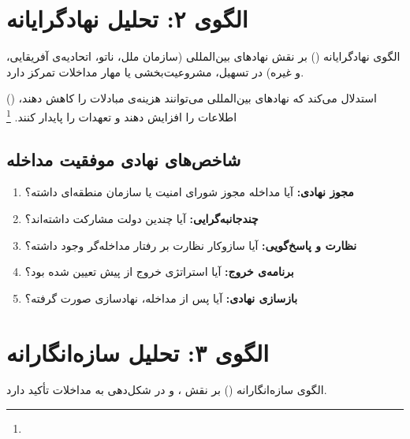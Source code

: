 \section{الگوی ۲: تحلیل نهادگرایانه}
\label{sec:ch03-institutional}

الگوی نهادگرایانه () بر نقش نهادهای بین‌المللی (سازمان ملل، ناتو، اتحادیه‌ی آفریقایی، و غیره) در تسهیل، مشروعیت‌بخشی یا مهار مداخلات تمرکز دارد.

 () استدلال می‌کند که نهادهای بین‌المللی می‌توانند هزینه‌ی مبادلات را کاهش دهند، اطلاعات را افزایش دهند و تعهدات را پایدار کنند.%
\footnote{}

\subsection{شاخص‌های نهادی موفقیت مداخله}
\label{subsec:ch03-inst-indicators}

\begin{tcolorbox}[defbox, title={شاخص‌های کلیدی}]
\begin{enumerate}[nosep, label=\textbf{\arabic*.}]
  \item \textbf{مجوز نهادی:} آیا مداخله مجوز شورای امنیت یا سازمان منطقه‌ای داشته؟
  \item \textbf{چندجانبه‌گرایی:} آیا چندین دولت مشارکت داشته‌اند؟
  \item \textbf{نظارت و پاسخ‌گویی:} آیا سازوکار نظارت بر رفتار مداخله‌گر وجود داشته؟
  \item \textbf{برنامه‌ی خروج:} آیا استراتژی خروج از پیش تعیین شده بود؟
  \item \textbf{بازسازی نهادی:} آیا پس از مداخله، نهادسازی صورت گرفته؟
\end{enumerate}
\end{tcolorbox}

\section{الگوی ۳: تحلیل سازه‌انگارانه}
\label{sec:ch03-constructivist}

الگوی سازه‌انگارانه () بر نقش ،  و  در شکل‌دهی به مداخلات تأکید دارد.

